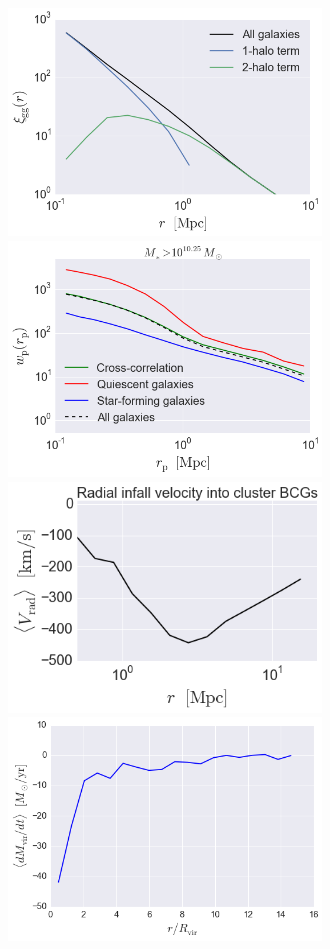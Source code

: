 \documentclass[usenatbib,usegraphicx,letterpaper]{mn2e}
\begin{document}
\begin{figure}
\begin{center}
\includegraphics[width=8.3cm]{./FIGS/one_two_halo_clustering.png}
\includegraphics[width=8.3cm]{./FIGS/wp_red_blue_cross.png}
\includegraphics[width=8.3cm]{./FIGS/cluster_bcg_infall_velocity.png}
\includegraphics[width=8.3cm]{./FIGS/radial_profile_halocat_tutorial_fig1.png}

\end{center}
\end{figure}
\end{document}
